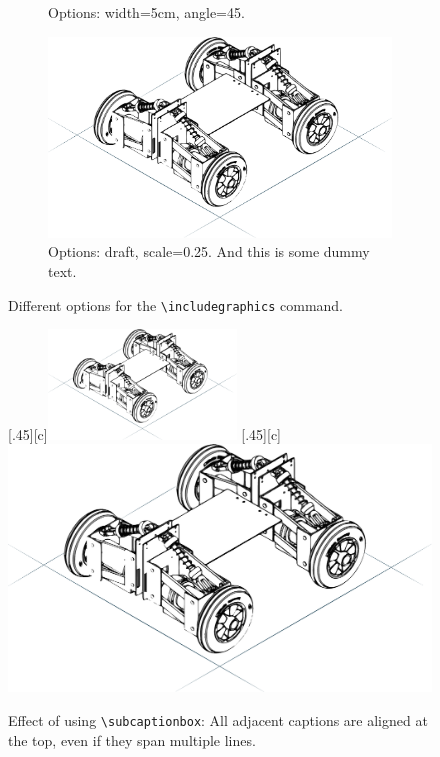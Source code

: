 \begin{figure}
\begin{subfigure}[b]{.45\linewidth}
	\caption{Options: width=5cm, angle=45.}
	\label{fig:angle}
\end{subfigure}\hfill
\begin{subfigure}[b]{.45\linewidth}
	\centering
	\includegraphics[draft, scale=0.25]{figures/trak_skeleton}
	\caption{Options: draft, scale=0.25. And this is some dummy text.}
	\label{fig:draft}
\end{subfigure}
\caption[Options of \texttt{\textbackslash includegraphics} and the \texttt{subfigure} environment]{Different options for the \texttt{\textbackslash includegraphics} command.}
\label{fig:options}
\end{figure}

\begin{figure}[H]
\centering
{}[.45\linewidth][c]{\includegraphics[width=5cm, angle=45]{figures/trak_skeleton}}
\hfill
{}[.45\linewidth][c]{\includegraphics[draft, scale=0.25]{figures/trak_skeleton}}
\caption[\texttt{\textbackslash subcaptionbox} for multi-figures]{Effect of using \texttt{\textbackslash subcaptionbox}: All adjacent captions are aligned at the top, even if they span multiple lines.}
\label{fig:capbox}
\end{figure}


